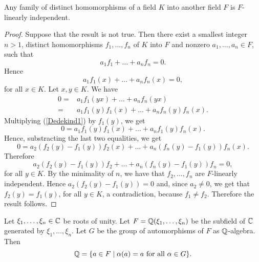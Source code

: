 \begin{lemma} 
Any family of distinct homomorphisms of a field $K$ into another field $F$ is $F$-linearly independent.
\end{lemma}

\begin{proof}
    Suppose that the result is not true. Then there exist a smallest integer $n>1$, distinct homomorphisms $f_1,\dots, f_n$ of $K$ into $F$ and nonzero $a_1,\dots ,a_n\in F$, such that
    \[ a_1f_1+\dots +a_nf_n=0.\]
    Hence
    \begin{equation}\label{Dedekind1}
    a_1f_1(x)+\dots +a_nf_n(x)=0,
    \end{equation}
    for all $x\in K$. Let $x,y\in K$. We have
    \begin{align*}
        0=&a_1f_1(yx)+\dots +a_nf_n(yx)\\
        =&a_1f_1(y)f_1(x)+\dots +a_nf_n(y)f_n(x).
    \end{align*}
    Multiplying (\ref{Dedekind1}) by $f_1(y)$, we get
    \[0=a_1f_1(y)f_1(x)+\dots +a_nf_1(y)f_n(x).\]
    Hence, substracting the last two equalities, we get
    \[0=a_2(f_2(y)-f_1(y))f_2(x)+\dots +a_n(f_n(y)-f_1(y))f_n(x).\]
    Therefore
    \[a_2(f_2(y)-f_1(y))f_2+\dots +a_n(f_n(y)-f_1(y))f_n=0,\]
    for all $y\in K$. By the minimality of $n$, we have that $f_2,\dots, f_n$ are $F$-linearly independent. Hence
    $a_2(f_2(y)-f_1(y))=0$ and, since $a_2\neq 0$, we get that $f_2(y)=f_1(y)$, for all $y\in K$, a contradiction, 
    because $f_1\neq f_2$. Therefore the result follows.  
\end{proof}

\begin{lemma}\label{fixedfield}
Let $\xi_1,\dots,\xi_n\in \mathbb{C}$ be roots of unity. Let $F=\mathbb{Q}(\xi_1,\dots ,\xi_n)$ be the subfield of $\mathbb{C}$ generated 
by $\xi_1,\dots ,\xi_n$. Let $G$ be the group of automorphisms of $F$ as $\mathbb{Q}$-algebra. Then
\[\mathbb{Q}=\{ a\in F\mid \alpha(a)=a \mbox{ for all }\alpha\in G\}.\]
\end{lemma}

